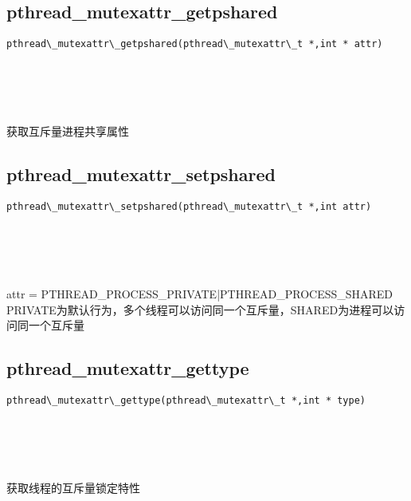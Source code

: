 \documentclass[10pt,a4paper]{article}
\begin{document}
\subsection{pthread\_mutexattr\_getpshared}
\begin{spacing}{2.0}
\lstset{language=C,numbers=none}
\begin{lstlisting}
pthread\_mutexattr\_getpshared(pthread\_mutexattr\_t *,int * attr)
\end{lstlisting}
{\large\color[rgb]{0.2,0.4,0.6}{*:}} \\
{\large\color[rgb]{0.2,0.4,0.6}{attr:}}
\paragraph{ \ \ }获取互斥量进程共享属性
\end{spacing}

\subsection{pthread\_mutexattr\_setpshared}
\begin{spacing}{2.0}
\lstset{language=C,numbers=none}
\begin{lstlisting}
pthread\_mutexattr\_setpshared(pthread\_mutexattr\_t *,int attr)
\end{lstlisting}
{\large\color[rgb]{0.2,0.4,0.6}{*:}} \\
{\large\color[rgb]{0.2,0.4,0.6}{attr:}}
\paragraph{ \ \ }attr = PTHREAD\_PROCESS\_PRIVATE|PTHREAD\_PROCESS\_SHARED PRIVATE为默认行为，多个线程可以访问同一个互斥量，SHARED为进程可以访问同一个互斥量
\end{spacing}

\subsection{pthread\_mutexattr\_gettype}
\begin{spacing}{2.0}
\lstset{language=C,numbers=none}
\begin{lstlisting}
pthread\_mutexattr\_gettype(pthread\_mutexattr\_t *,int * type)
\end{lstlisting}
{\large\color[rgb]{0.2,0.4,0.6}{*:}} \\
{\large\color[rgb]{0.2,0.4,0.6}{type:}}
\paragraph{ \ \ }获取线程的互斥量锁定特性
\end{spacing}
\end{document}
